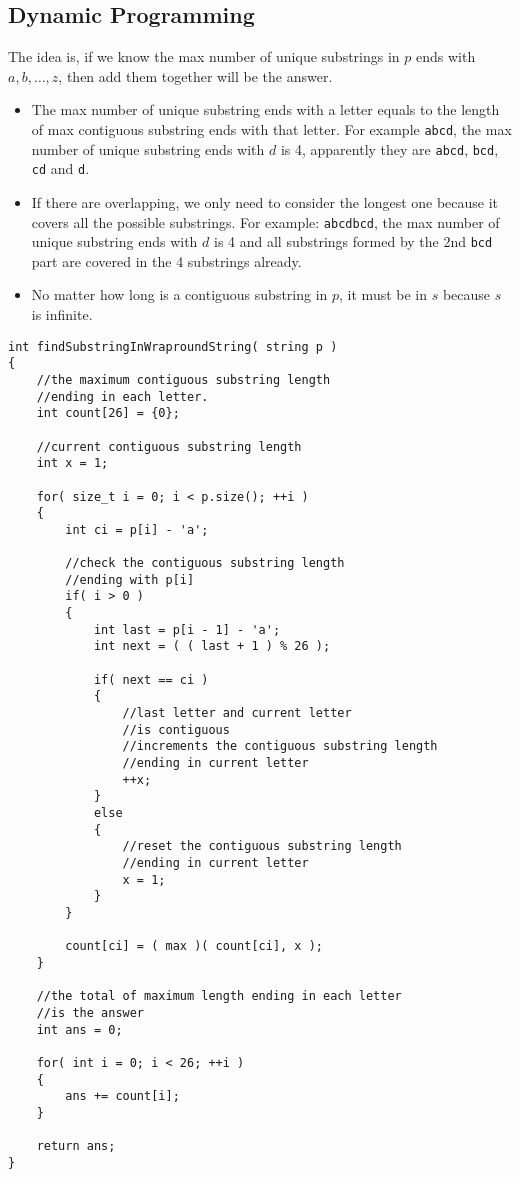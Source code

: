 \subsection{Dynamic Programming}
The idea is, if we know the max number of unique substrings in $p$ ends with $a, b, \ldots, z$, then add them together will be the answer. 

\begin{itemize}
\item The max number of unique substring ends with a letter equals to the length of max contiguous substring ends with that letter. For example \texttt{abcd}, the max number of unique substring ends with $d$ is 4, apparently they are \texttt{abcd}, \texttt{bcd}, \texttt{cd} and \texttt{d}.
\item If there are overlapping, we only need to consider the longest one because it covers all the possible substrings. For example: \texttt{abcdbcd}, the max number of unique substring ends with $d$ is 4 and all substrings formed by the 2nd \texttt{bcd} part are covered in the 4 substrings already.
\item No matter how long is a contiguous substring in $p$, it must be in $s$ because $s$ is infinite.
\end{itemize}

\setcounter{lstlisting}{0}
\begin{lstlisting}[style=customc, caption={Dynamic Programming}]
int findSubstringInWraproundString( string p )
{
	//the maximum contiguous substring length 
	//ending in each letter.
    int count[26] = {0};

	//current contiguous substring length
    int x = 1;

    for( size_t i = 0; i < p.size(); ++i )
    {
        int ci = p[i] - 'a';

        //check the contiguous substring length
        //ending with p[i]
        if( i > 0 )
        {
            int last = p[i - 1] - 'a';
            int next = ( ( last + 1 ) % 26 );

            if( next == ci )
            {
				//last letter and current letter
				//is contiguous
				//increments the contiguous substring length
				//ending in current letter
                ++x; 
            }
            else
            {
				//reset the contiguous substring length
				//ending in current letter
                x = 1;
            }
        }

        count[ci] = ( max )( count[ci], x );
    }

    //the total of maximum length ending in each letter
    //is the answer
    int ans = 0;

    for( int i = 0; i < 26; ++i )
    {
        ans += count[i];
    }

    return ans;
}
\end{lstlisting}